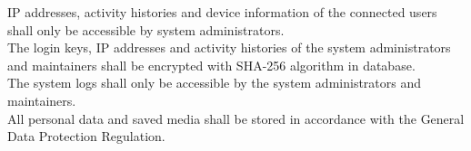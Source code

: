 \req IP addresses, activity histories and device information of the connected users shall only be accessible by system administrators. \\
\req The login keys, IP addresses and activity histories of the system administrators and maintainers shall be encrypted with SHA-256 algorithm in database. \\
\req The system logs shall only be accessible by the system administrators and maintainers. \\
\req All personal data and saved media shall be stored in accordance with the General Data Protection Regulation. \\